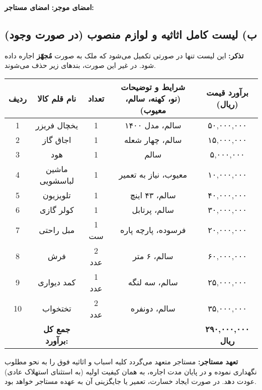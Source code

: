 \documentclass[12pt]{article}
\begin{document}
	\vspace{1cm}
	\noindent
	\textbf{امضای موجر:} \hrulefill \hspace{2cm} \textbf{امضای مستاجر:} \hrulefill
	
	\vspace{2cm}
	\subsection*{ب) لیست کامل اثاثیه و لوازم منصوب (در صورت وجود)}
	\noindent
	\textbf{تذکر:} این لیست تنها در صورتی تکمیل می‌شود که ملک به صورت \textbf{مُجهّز} اجاره داده شود. در غیر این صورت، بندهای زیر حذف می‌شوند.
	
	\begin{center}
		\renewcommand{\arraystretch}{1.5}
		\begin{tabular}{|c|c|c|c|c|}
			\hline
			\textbf{ردیف} & \textbf{نام قلم کالا} & \textbf{تعداد} & \textbf{شرایط و توضیحات (نو، کهنه، سالم، معیوب)} & \textbf{برآورد قیمت (ریال)} \\
			\hline
			1 & یخچال فریزر & 1 & سالم، مدل ۱۴۰۰ & ۵۰,۰۰۰,۰۰۰ \\
			\hline
			2 & اجاق گاز & 1 & سالم، چهار شعله & ۱۵,۰۰۰,۰۰۰ \\
			\hline
			3 & هود & 1 & سالم & ۵,۰۰۰,۰۰۰ \\
			\hline
			4 & ماشین لباسشویی & 1 & معیوب، نیاز به تعمیر & ۱۰,۰۰۰,۰۰۰ \\
			\hline
			5 & تلویزیون & 1 & سالم، ۴۳ اینچ & ۴۰,۰۰۰,۰۰۰ \\
			\hline
			6 & کولر گازی & 1 & سالم، پرتابل & ۳۰,۰۰۰,۰۰۰ \\
			\hline
			7 & مبل راحتی & 1 ست & فرسوده، پارچه پاره & ۲۰,۰۰۰,۰۰۰ \\
			\hline
			8 & فرش & 2 عدد & سالم، ۶ متر & ۶۰,۰۰۰,۰۰۰ \\
			\hline
			9 & کمد دیواری & 1 عدد & سالم، سه لنگه & ۲۵,۰۰۰,۰۰۰ \\
			\hline
			10 & تختخواب & 2 عدد & سالم، دونفره & ۳۵,۰۰۰,۰۰۰ \\
			\hline
			& \textbf{جمع کل برآورد:} & & & \textbf{۲۹۰,۰۰۰,۰۰۰ ریال} \\
			\hline
		\end{tabular}
	\end{center}
	
	\vspace{1cm}
	\noindent
	\textbf{تعهد مستاجر:} مستاجر متعهد می‌گردد کلیه اسباب و اثاثیه فوق را به نحو مطلوب نگهداری نموده و در پایان مدت اجاره، به همان کیفیت اولیه (به استثنای استهلاک عادی) عودت دهد. در صورت ایجاد خسارت، تعمیر یا جایگزینی آن به عهده مستاجر خواهد بود.
	
\end{document}
